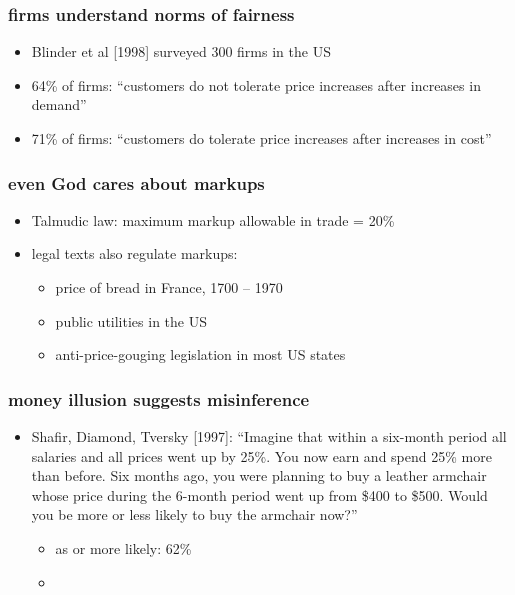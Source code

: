 \documentclass[12pt,xcolor={dvipsnames},hyperref={pdftex,pdfpagemode=UseNone,hidelinks,pdfdisplaydoctitle=true},usepdftitle=false]{beamer}
\begin{document}
\begin{frame}
\frametitle{firms understand norms of fairness}
\begin{itemize}
\item Blinder et al [1998] surveyed 300 firms in the US
\item  64\% of firms: ``customers do not tolerate price increases after increases in demand'' 
\item 71\% of firms: ``customers do tolerate price increases after increases in cost''
\end{itemize}
\end{frame}

\begin{frame}
\frametitle{even God cares about markups}
\begin{itemize}
\item Talmudic law: maximum markup allowable in trade = 20\%
\item legal texts also regulate markups:
\begin{itemize}
	\item price of bread in France, 1700 -- 1970
	\item public utilities in the US
	\item anti-price-gouging legislation in most US states
\end{itemize}
\end{itemize}
\end{frame}

\begin{frame}
\frametitle{money illusion suggests misinference}
\begin{itemize}
\item Shafir, Diamond, Tversky [1997]: ``Imagine that within a six-month period all salaries and all prices went up by 25\%. You now earn and spend 25\% more than before. Six months ago, you were planning to buy a leather armchair whose price during the 6-month period went up from \$400 to \$500. Would you be more or less likely to buy the armchair now?''
\begin{itemize}
\item as or more likely: 62\%
\item {}
\end{itemize}
\end{itemize} 
\end{frame}

\begin{frame}
\end{frame}
\end{document}
